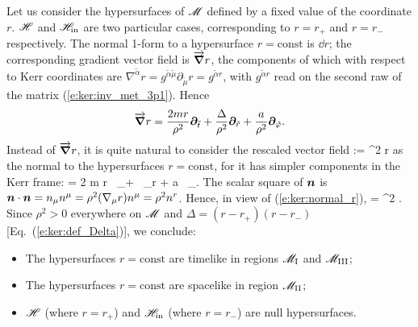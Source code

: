 Let us consider the hypersurfaces of $\mathscr{M}$ defined by a fixed value of
the coordinate $r$. $\mathscr{H}$ and $\mathscr{H}_{\rm in}$ are two particular cases,
corresponding to $r=r_+$ and $r=r_-$ respectively.
The normal 1-form to a hypersurface $r=\mathrm{const}$ is $\dd r$; the corresponding
gradient vector field is $\overrightarrow{\bm{\nabla}} r$, the components of which with respect
to Kerr coordinates are
$\nabla^{\tilde{\alpha}} r = g^{\tilde{\alpha}\tilde{\mu}} \partial_{\tilde{\mu}} r
= g^{\tilde{\alpha} r}$, with $g^{\tilde{\alpha} r}$ read on the second raw
of the matrix (\ref{e:ker:inv_met_3p1}). Hence
\[
    \overrightarrow{\bm{\nabla}} r = \frac{2m r}{\rho^2} \bm{\partial}_{\tilde t}
        +  \frac{\Delta}{\rho^2}\bm{\partial}_{\tilde r}
        +  \frac{a}{\rho^2} \bm{\partial}_{\tilde\varphi} .
\]
Instead of $ \overrightarrow{\bm{\nabla}} r$, it is quite natural to consider the rescaled vector field
\be
     := \rho^2 \vw{\nabla} r
\ee
as the normal to the hypersurfaces $r=\mathrm{const}$, for it
has simpler components in the Kerr frame:
\be \label{e:ker:normal_r}
     = 2 m r \, \wpar_\ti + \Delta \, \wpar_{\tilde r} + a \, \wpar_\tph .
\ee
The scalar square of $\bm{n}$ is
$\bm{n}\cdot\bm{n} = n_\mu n^\mu = \rho^2 (\nabla_\mu r) n^\mu = \rho^2 n^r$.
Hence, in view of (\ref{e:ker:normal_r}),
\be
    \cdot{} = \rho^2 \Delta .
\ee
Since $\rho^2>0$ everywhere on $\mathscr{M}$ and $\Delta = (r-r_+)(r-r_-)$ [Eq.~(\ref{e:ker:def_Delta})], we conclude:
\begin{prop}[causal type of the hypersurfaces $r=\mathrm{const}$]
\begin{itemize}
\item The hypersurfaces $r=\mathrm{const}$ are timelike in regions $\mathscr{M}_{\rm I}$ and $\mathscr{M}_{\rm III}$;
\item The hypersurfaces $r=\mathrm{const}$ are spacelike in region $\mathscr{M}_{\rm II}$;
\item $\mathscr{H}$ (where $r=r_+$) and $\mathscr{H}_{\rm in}$ (where $r=r_-$) are null hypersurfaces.
\end{itemize}
\end{prop}

